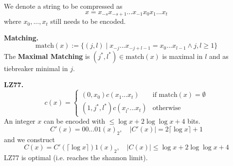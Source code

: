 We denote a string to be compressed as 
\[x = x_{-s}x_{-s+1}...x_{-1}x_0x_1...x_t\]
where \(x_0, ..., x_t\) still needs to be encoded.

\textbf{Matching.}
\[\text{match}(x) := \{(j, l) \mid x_{-j}...x_{-j+l-1} = x_{0}...x_{l-1} \land j, l \geq 1\}\]
The \textbf{Maximal Matching} is \((j^*, l^*) \in \text{match}(x)\) is maximal in \(l\) and as tiebreaker minimal in \(j\).

\textbf{LZ77.}
\[c(x) = \begin{cases}
    (0, x_0)c(x_1...x_t) & \text{if match}(x) = \emptyset\\
    (1, j^*, l^*)c(x_{l^*}...x_t) & \text{otherwise}
\end{cases}\]
An integer \(x\) can be encoded with \(\leq \log x + 2 \log \log x + 4\) bits.
\[C'(x) = 00...01(x)_2, \quad |C'(x)| = 2 \lceil \log x \rceil + 1\]
and we construct
\[C(x) = C'(\lceil \log x\rceil)1(x)_2, \quad |C(x)| \leq \log x + 2 \log \log x + 4\]
LZ77 is optimal (i.e. reaches the shannon limit).
